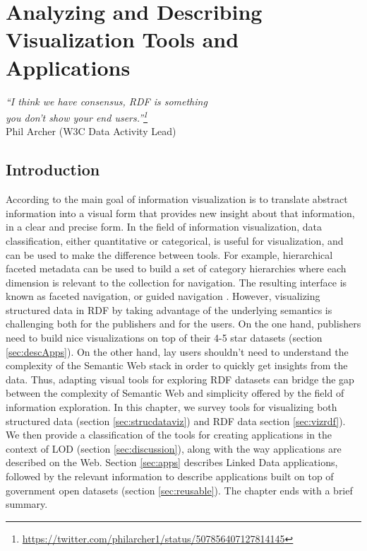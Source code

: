 \chapter{Analyzing and Describing Visualization Tools and Applications}
\label{ch:ch4}

\begin{flushright}
\textit{``I think we have consensus, RDF is something \\
you don't show your end users.''\footnote{\url{https://twitter.com/philarcher1/status/507856407127814145}}}  \\
Phil Archer (W3C Data Activity Lead)
\end{flushright}


\section*{Introduction}
\label{sec:intro-ch4}

According to \cite{marti2009} the main goal of information visualization is to translate abstract information into a visual form that provides new insight about that information, in a clear and precise form. In the field of information visualization, data classification, either quantitative or categorical, is useful for visualization, and can be used to make the difference between tools. For example, hierarchical faceted metadata can be used to build a set of category hierarchies where each dimension is relevant to the collection for navigation. The resulting interface is known as faceted navigation, or guided navigation \cite{hearst02}. However, visualizing structured data in RDF by taking advantage of the underlying semantics is challenging both for the publishers and for the users. On the one hand, publishers need to build nice visualizations on top of their 4-5 star datasets (section \ref{sec:descApps}). On the other hand, lay users shouldn't need to understand the complexity of the Semantic Web stack in order to quickly get insights from the data. Thus, adapting visual tools for exploring RDF datasets can bridge the gap between the complexity of Semantic Web and simplicity offered by the field of information exploration. In this chapter, we survey tools for visualizing both structured data (section \ref{sec:strucdataviz}) and RDF data section \ref{sec:vizrdf}). We then provide a classification of the tools for creating applications in the context of LOD (section \ref{sec:discussion}), along with the way applications are described on the Web. Section \ref{sec:apps} describes Linked Data applications, followed by the relevant information to describe applications built on top of government open datasets (section \ref{sec:reusable}). The chapter ends with a brief summary.


